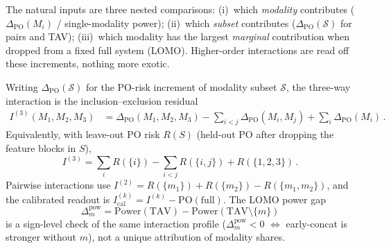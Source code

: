
The natural inputs are three nested comparisons:
(i)~which \emph{modality} contributes
($\Delta_{\mathrm{PO}}(M_i)$ / single-modality power);
(ii)~which \emph{subset} contributes
($\Delta_{\mathrm{PO}}(\mathcal{S})$ for pairs and TAV);
(iii)~which modality has the largest \emph{marginal} contribution when dropped
from a fixed full system (LOMO).
Higher-order interactions are read off these increments, nothing more exotic.

Writing $\Delta_{\mathrm{PO}}(\mathcal{S})$ for the PO-risk increment of modality
subset $\mathcal{S}$, the three-way interaction is the inclusion--exclusion residual
\begin{equation}
\label{eq:I3-delta-po}
\begin{aligned}
I^{(3)}(M_1,M_2,M_3)
&=
\Delta_{\mathrm{PO}}(M_1,M_2,M_3)
-
\sum_{i<j}\Delta_{\mathrm{PO}}(M_i,M_j)
+
\sum_{i}\Delta_{\mathrm{PO}}(M_i)\,.
\end{aligned}
\end{equation}
Equivalently, with leave-out PO risk $R(S)$ (held-out PO after dropping the
feature blocks in $S$),
\begin{equation}
\label{eq:I3-leaveout}
I^{(3)}
=
\sum_{i} R(\{i\})
-
\sum_{i<j} R(\{i,j\})
+
R(\{1,2,3\})\,.
\end{equation}
Pairwise interactions use
$I^{(2)}=R(\{m_1\})+R(\{m_2\})-R(\{m_1,m_2\})$, and the calibrated readout is
$I_{\mathrm{cal}}^{(k)}=I^{(k)}-\mathrm{PO}(\mathrm{full})$.
The LOMO power gap
\begin{equation}
\label{eq:lomo-power}
\Delta^{\mathrm{pow}}_{m}
=
\mathrm{Power}(\mathrm{TAV})
-
\mathrm{Power}(\mathrm{TAV}\setminus\{m\})
\end{equation}
is a sign-level check of the same interaction profile
($\Delta^{\mathrm{pow}}_{m}<0$ $\Leftrightarrow$ early-concat is stronger without $m$),
not a unique attribution of modality shares.

